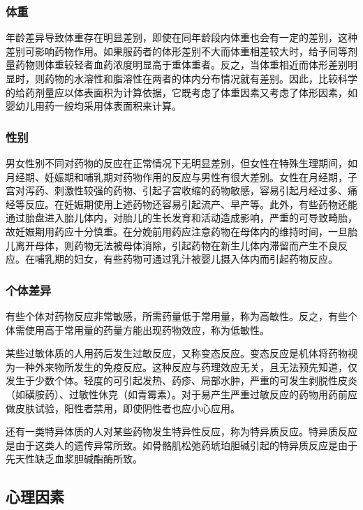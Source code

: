 \subsubsection{体重}

年龄差异导致体重存在明显差别，即使在同年龄段内体重也会有一定的差别，这种差别可影响药物作用。如果服药者的体形差别不大而体重相差较大时，给予同等剂量药物则体重较轻者血药浓度明显高于重体重者。反之，当体重相近而体形差别明显时，则药物的水溶性和脂溶性在两者的体内分布情况就有差别。因此，比较科学的给药剂量应以体表面积为计算依据，它既考虑了体重因素又考虑了体形因素，如婴幼儿用药一般均采用体表面积来计算。

\subsubsection{性别}

男女性别不同对药物的反应在正常情况下无明显差别，但女性在特殊生理期间，如月经期、妊娠期和哺乳期对药物作用的反应与男性有很大差别。女性在月经期，子宫对泻药、刺激性较强的药物、引起子宫收缩的药物敏感，容易引起月经过多、痛经等反应。在妊娠期使用上述药物还容易引起流产、早产等。此外，有些药物还能通过胎盘进入胎儿体内，对胎儿的生长发育和活动造成影响，严重的可导致畸胎，故妊娠期用药应十分慎重。在分娩前用药应注意药物在母体内的维持时间，一旦胎儿离开母体，则药物无法被母体消除，引起药物在新生儿体内滞留而产生不良反应。在哺乳期的妇女，有些药物可通过乳汁被婴儿摄入体内而引起药物反应。

\subsubsection{个体差异}

有些个体对药物反应非常敏感，所需药量低于常用量，称为高敏性。反之，有些个体需使用高于常用量的药量方能出现药物效应，称为低敏性。

某些过敏体质的人用药后发生过敏反应，又称变态反应。变态反应是机体将药物视为一种外来物所发生的免疫反应。这种反应与药理效应无关，且无法预先知道，仅发生于少数个体。轻度的可引起发热、药疹、局部水肿，严重的可发生剥脱性皮炎（如磺胺药）、过敏性休克（如青霉素）。对于易产生严重过敏反应的药物用药前应做皮肤试验，阳性者禁用，即使阴性者也应小心应用。

还有一类特异体质的人对某些药物发生特异性反应，称为特异质反应。特异质反应是由于这类人的遗传异常所致。如骨骼肌松弛药琥珀胆碱引起的特异质反应是由于先天性缺乏血浆胆碱酯酶所致。

\subsection{心理因素}

